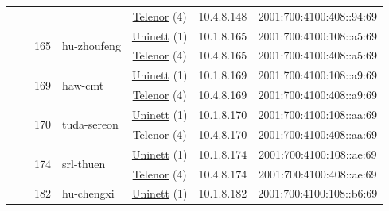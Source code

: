 \begin{small}
\begin{center}
\begin{longtable}{|c|c|c|c|c|c|c|c|}
  &  &  &  & \multicolumn{2}{|c|}{\tiny{\href{https://www.telenor.no}{Telenor} (4)}} & \tiny{10.4.8.148} & \tiny{2001:700:4100:408::94:69} \\* \cline{3-3}\cline{4-4}\cline{5-5}\cline{6-6}\cline{7-7}\cline{8-8}
  &  & \multirow{2}{*}{\tiny{165}} & \multicolumn{1}{|l|}{\multirow{2}{*}{\tiny{hu-zhoufeng}}} & \multicolumn{2}{|c|}{\tiny{\href{https://www.uninett.no}{Uninett} (1)}} & \tiny{10.1.8.165} & \tiny{2001:700:4100:108::a5:69} \\* \cline{5-5}\cline{6-6}\cline{7-7}\cline{8-8}
  &  &  &  & \multicolumn{2}{|c|}{\tiny{\href{https://www.telenor.no}{Telenor} (4)}} & \tiny{10.4.8.165} & \tiny{2001:700:4100:408::a5:69} \\* \cline{3-3}\cline{4-4}\cline{5-5}\cline{6-6}\cline{7-7}\cline{8-8}
  &  & \multirow{2}{*}{\tiny{169}} & \multicolumn{1}{|l|}{\multirow{2}{*}{\tiny{haw-cmt}}} & \multicolumn{2}{|c|}{\tiny{\href{https://www.uninett.no}{Uninett} (1)}} & \tiny{10.1.8.169} & \tiny{2001:700:4100:108::a9:69} \\* \cline{5-5}\cline{6-6}\cline{7-7}\cline{8-8}
  &  &  &  & \multicolumn{2}{|c|}{\tiny{\href{https://www.telenor.no}{Telenor} (4)}} & \tiny{10.4.8.169} & \tiny{2001:700:4100:408::a9:69} \\* \cline{3-3}\cline{4-4}\cline{5-5}\cline{6-6}\cline{7-7}\cline{8-8}
  &  & \multirow{2}{*}{\tiny{170}} & \multicolumn{1}{|l|}{\multirow{2}{*}{\tiny{tuda-sereon}}} & \multicolumn{2}{|c|}{\tiny{\href{https://www.uninett.no}{Uninett} (1)}} & \tiny{10.1.8.170} & \tiny{2001:700:4100:108::aa:69} \\* \cline{5-5}\cline{6-6}\cline{7-7}\cline{8-8}
  &  &  &  & \multicolumn{2}{|c|}{\tiny{\href{https://www.telenor.no}{Telenor} (4)}} & \tiny{10.4.8.170} & \tiny{2001:700:4100:408::aa:69} \\* \cline{3-3}\cline{4-4}\cline{5-5}\cline{6-6}\cline{7-7}\cline{8-8}
  &  & \multirow{2}{*}{\tiny{174}} & \multicolumn{1}{|l|}{\multirow{2}{*}{\tiny{srl-thuen}}} & \multicolumn{2}{|c|}{\tiny{\href{https://www.uninett.no}{Uninett} (1)}} & \tiny{10.1.8.174} & \tiny{2001:700:4100:108::ae:69} \\* \cline{5-5}\cline{6-6}\cline{7-7}\cline{8-8}
  &  &  &  & \multicolumn{2}{|c|}{\tiny{\href{https://www.telenor.no}{Telenor} (4)}} & \tiny{10.4.8.174} & \tiny{2001:700:4100:408::ae:69} \\* \cline{3-3}\cline{4-4}\cline{5-5}\cline{6-6}\cline{7-7}\cline{8-8}
  &  & \multirow{2}{*}{\tiny{182}} & \multicolumn{1}{|l|}{\multirow{2}{*}{\tiny{hu-chengxi}}} & \multicolumn{2}{|c|}{\tiny{\href{https://www.uninett.no}{Uninett} (1)}} & \tiny{10.1.8.182} & \tiny{2001:700:4100:108::b6:69} \\* \cline{5-5}\cline{6-6}\cline{7-7}\cline{8-8}

\end{longtable}
\end{center}
\end{small}
